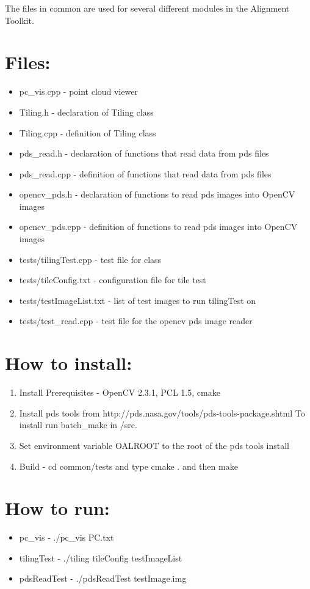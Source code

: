 \documentclass[float=false, crop=false]{standalone}
\begin{document}
The files in common are used for several different modules in the Alignment Toolkit.

\section{Files:}
\begin{itemize}
\item{pc\_vis.cpp} - point cloud viewer
\item{Tiling.h} - declaration of Tiling class
\item{Tiling.cpp} - definition of Tiling class
\item{pds\_read.h} - declaration of functions that read data from pds files
\item{pds\_read.cpp} - definition of functions that read data from pds files
\item{opencv\_pds.h} - declaration of functions to read pds images into OpenCV images
\item{opencv\_pds.cpp} - definition of functions to read pds images into OpenCV images
\item{tests/tilingTest.cpp} - test file for class
\item{tests/tileConfig.txt} - configuration file for tile test
\item{tests/testImageList.txt} - list of test images to run tilingTest on
\item{tests/test\_read.cpp} - test file for the opencv pds image reader

\end{itemize}

\section{How to install:}
\begin{enumerate}
	\item{Install Prerequisites} - OpenCV 2.3.1, PCL 1.5, cmake 
   \item{Install} pds tools from http://pds.nasa.gov/tools/pds-tools-package.shtml To install run batch\_make in /src. 
   \item{Set} environment variable OALROOT to the root of the pds tools install
	\item{Build} - cd common/tests and type cmake . and then make
\end{enumerate}

\section{How to run:}
\begin{itemize}
	\item{pc\_vis} - ./pc\_vis PC.txt
	\item{tilingTest} - ./tiling tileConfig testImageList
	\item{pdsReadTest} - ./pdsReadTest testImage.img
\end{itemize}
\end{document}

